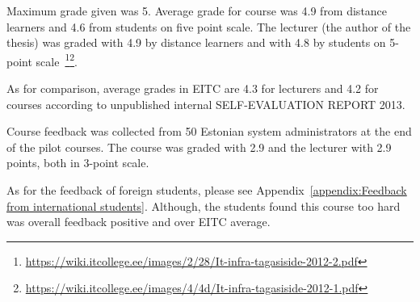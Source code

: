 Maximum grade given was 5. Average grade for course was 4.9 from distance learners and 4.6 from students on five point scale. The lecturer (the author of the thesis) was graded with 4.9 by distance learners and with 4.8 by students on 5-point scale~\footnote{\url{https://wiki.itcollege.ee/images/2/28/It-infra-tagasiside-2012-2.pdf}}\footnote{\url{https://wiki.itcollege.ee/images/4/4d/It-infra-tagasiside-2012-1.pdf}}.

As for comparison, average grades in \gls{EITC} are 4.3 for lecturers and 4.2 for courses according to unpublished internal SELF-EVALUATION REPORT 2013.

Course feedback was collected from 50 Estonian system administrators at the end of the pilot courses. The course was graded with 2.9 and the lecturer with 2.9 points, both in 3-point scale.



As for the feedback of foreign students, please see Appendix~\ref{appendix:Feedback from international students}.
Although, the students found this course too hard was overall feedback positive and over \gls{EITC} average.